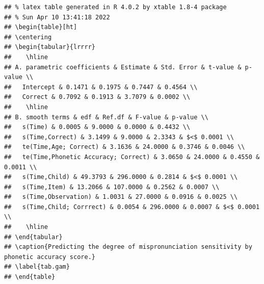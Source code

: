 \documentclass[
]{article}
\begin{document}
\begin{verbatim}
## % latex table generated in R 4.0.2 by xtable 1.8-4 package
## % Sun Apr 10 13:41:18 2022
## \begin{table}[ht]
## \centering
## \begin{tabular}{lrrrr}
##    \hline
## A. parametric coefficients & Estimate & Std. Error & t-value & p-value \\ 
##   Intercept & 0.1471 & 0.1975 & 0.7447 & 0.4564 \\ 
##   Correct & 0.7092 & 0.1913 & 3.7079 & 0.0002 \\ 
##    \hline
## B. smooth terms & edf & Ref.df & F-value & p-value \\ 
##   s(Time) & 0.0005 & 9.0000 & 0.0000 & 0.4432 \\ 
##   s(Time,Correct) & 3.1499 & 9.0000 & 2.3343 & $<$ 0.0001 \\ 
##   te(Time,Age; Correct) & 3.1636 & 24.0000 & 0.3746 & 0.0046 \\ 
##   te(Time,Phonetic Accuracy; Correct) & 3.0650 & 24.0000 & 0.4550 & 0.0011 \\ 
##   s(Time,Child) & 49.3793 & 296.0000 & 0.2814 & $<$ 0.0001 \\ 
##   s(Time,Item) & 13.2066 & 107.0000 & 0.2562 & 0.0007 \\ 
##   s(Time,Observation) & 1.0031 & 27.0000 & 0.0916 & 0.0025 \\ 
##   s(Time,Child; Corrrect) & 0.0054 & 296.0000 & 0.0007 & $<$ 0.0001 \\ 
##    \hline
## \end{tabular}
## \caption{Predicting the degree of mispronunciation sensitivity by phonetic accuracy score.} 
## \label{tab.gam}
## \end{table}
\end{verbatim}
\end{document}
